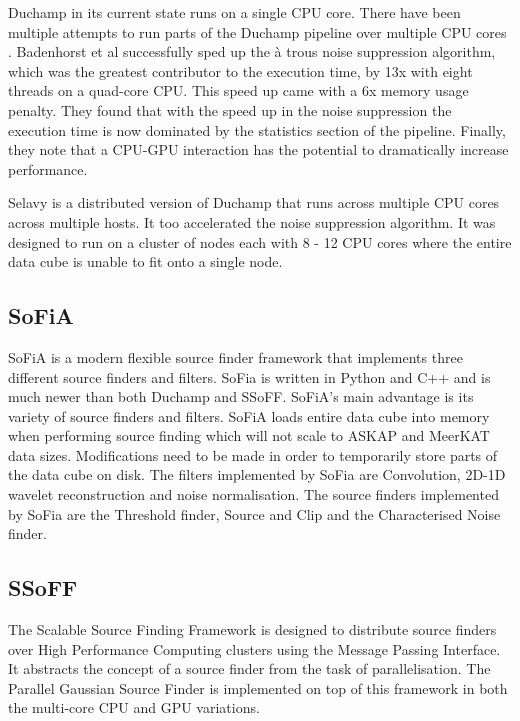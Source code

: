 \documentclass[prodmode,acmtecs]{acmsmall} \usepackage[ruled]{algorithm2e}
\begin{document}
Duchamp in its current state runs on a single CPU core. There have been multiple attempts to run
parts of the Duchamp pipeline over multiple CPU cores \cite{scott} \cite{whiting2012source}. Badenhorst et al 
 successfully sped up the \`{a} trous noise suppression algorithm, which was the greatest contributor to the 
execution time, by 13x with eight threads on a quad-core CPU.
This speed up came with a 6x memory usage penalty. They found that with the speed up in the noise
suppression the execution time is now dominated by the statistics section of the pipeline. Finally,
they note that a CPU-GPU interaction has the potential to dramatically increase performance.

Selavy \cite{whiting2012source} is a distributed version of Duchamp that runs across multiple CPU
\cite{} cores across multiple hosts. It too accelerated the noise suppression algorithm. 
It was designed to run on a cluster of nodes each with 8 - 12
CPU cores where the entire data cube is unable to fit onto a single node. 


    \subsection{SoFiA}
    SoFiA is a modern flexible source finder framework that implements three different source finders
    and filters. SoFia is written in Python and C++ and is much newer than both Duchamp and SSoFF. 
    SoFiA's main advantage is its variety of source finders and filters.  
    SoFiA loads entire data cube into memory when performing source finding which will not scale to ASKAP
    and MeerKAT data sizes. Modifications need to be made in order to temporarily store parts of the data cube
    on disk.
    The filters implemented by SoFia are Convolution, 2D-1D wavelet reconstruction and noise normalisation.
    The source finders implemented by SoFia are the Threshold finder, Source and Clip and the Characterised Noise
    finder. 
        \cite{serra2015sofia}
        
     

        \subsection{SSoFF}
The Scalable Source Finding Framework  is designed to distribute source finders over High Performance
Computing clusters using the Message Passing Interface. It abstracts the concept of a source finder from
the task of parallelisation. The Parallel Gaussian Source Finder is implemented on top
of this framework in both the multi-core CPU and GPU variations.
\end{document}
